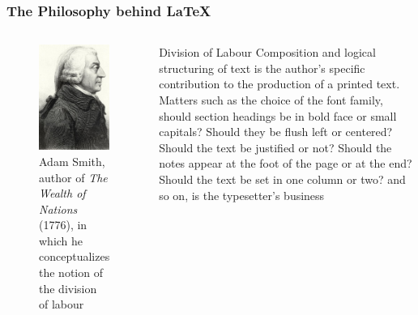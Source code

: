 \documentclass[10pt]{beamer}\usepackage[]{graphicx}\usepackage[]{color}
\begin{document}
\begin{frame}\frametitle{The Philosophy behind \LaTeX}
\begin{columns}[c] %

\begin{figure}[h!]
\centering
\includegraphics[scale=0.6, keepaspectratio]{./smith}
\small
\caption{Adam Smith, author of \textit{The Wealth of Nations} (1776), in which he conceptualizes the notion of the division of labour}
\label{fig:smith}
\end{figure}

\small
\begin{block}{Division of Labour}
Composition and logical structuring of text is the author's specific contribution to the production of a printed text. Matters such as the choice of the font family, should section headings be in bold face or small capitals? Should they be flush left or centered? Should the text be justified or not? Should the notes appear at the foot of the page or at the end? Should the text be set in one column or two? and so on, is the typesetter's business
\end{block}
\end{columns}

\end{frame}
\end{document}
